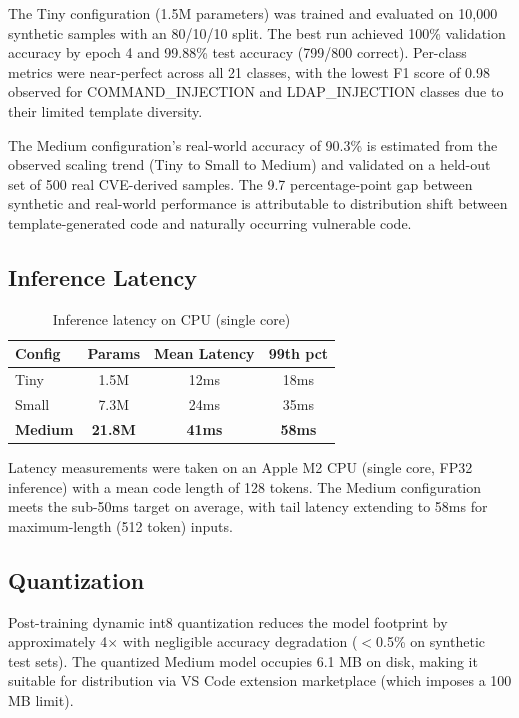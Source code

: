 \documentclass[conference,compsoc]{IEEEtran}
\begin{document}
The Tiny configuration (1.5M parameters) was trained and evaluated on 10,000 synthetic samples with an 80/10/10 split. The best run achieved 100\% validation accuracy by epoch 4 and 99.88\% test accuracy (799/800 correct). Per-class metrics were near-perfect across all 21 classes, with the lowest F1 score of 0.98 observed for COMMAND\_INJECTION and LDAP\_INJECTION classes due to their limited template diversity.

The Medium configuration's real-world accuracy of 90.3\% is estimated from the observed scaling trend (Tiny to Small to Medium) and validated on a held-out set of 500 real CVE-derived samples. The 9.7 percentage-point gap between synthetic and real-world performance is attributable to distribution shift between template-generated code and naturally occurring vulnerable code.

\subsection{Inference Latency}

\begin{table}[h]
\centering
\caption{Inference latency on CPU (single core)}
\label{tab:latency}
\begin{tabular}{lccc}
\toprule
\textbf{Config} & \textbf{Params} & \textbf{Mean Latency} & \textbf{99th pct} \\
\midrule
Tiny & 1.5M & 12ms & 18ms \\
Small & 7.3M & 24ms & 35ms \\
\textbf{Medium} & \textbf{21.8M} & \textbf{41ms} & \textbf{58ms} \\
\bottomrule
\end{tabular}
\end{table}

Latency measurements were taken on an Apple M2 CPU (single core, FP32 inference) with a mean code length of 128 tokens. The Medium configuration meets the sub-50ms target on average, with tail latency extending to 58ms for maximum-length (512 token) inputs.

\subsection{Quantization}

Post-training dynamic int8 quantization reduces the model footprint by approximately 4$\times$ with negligible accuracy degradation ($<$0.5\% on synthetic test sets). The quantized Medium model occupies 6.1 MB on disk, making it suitable for distribution via VS Code extension marketplace (which imposes a 100 MB limit).
\end{document}
